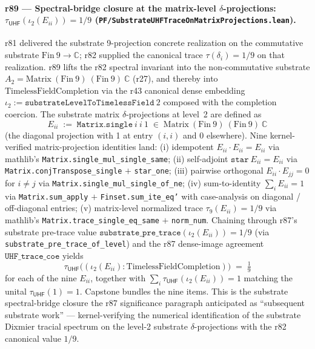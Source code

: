 \documentclass[11pt,a4paper]{amsart}
\theoremstyle{plain}
\theoremstyle{definition}
\begin{document}
\paragraph{r89 --- Spectral-bridge closure at the matrix-level $\delta$-projections: $\tau_{\textsf{UHF}}(\iota_2(E_{ii})) = 1/9$ (\texttt{PF/SubstrateUHFTraceOnMatrixProjections.lean}).} r81 delivered the substrate 9-projection concrete realization on the commutative substrate $\mathrm{Fin}~9 \to \mathbb{C}$; r82 supplied the canonical trace $\tau(\delta_i) = 1/9$ on that realization. r89 lifts the r82 spectral invariant into the non-commutative substrate $A_2 = \mathrm{Matrix}~(\mathrm{Fin}~9)~(\mathrm{Fin}~9)~\mathbb{C}$ (r27), and thereby into $\mathrm{TimelessFieldCompletion}$ via the r43 canonical dense embedding $\iota_2 := \mathtt{substrateLevelToTimelessField}~2$ composed with the completion coercion. The substrate matrix $\delta$-projections at level~2 are defined as
\[
E_{ii} \;:=\; \mathtt{Matrix.single}~i~i~1 \;\in\; \mathrm{Matrix}~(\mathrm{Fin}~9)~(\mathrm{Fin}~9)~\mathbb{C}
\]
(the diagonal projection with 1 at entry $(i,i)$ and 0 elsewhere). Nine kernel-verified matrix-projection identities land: (i) idempotent $E_{ii} \cdot E_{ii} = E_{ii}$ via mathlib's \texttt{Matrix.single\_mul\_single\_same}; (ii) self-adjoint $\mathtt{star}~E_{ii} = E_{ii}$ via \texttt{Matrix.conjTranspose\_single} $+$ \texttt{star\_one}; (iii) pairwise orthogonal $E_{ii} \cdot E_{jj} = 0$ for $i \ne j$ via \texttt{Matrix.single\_mul\_single\_of\_ne}; (iv) sum-to-identity $\sum_i E_{ii} = 1$ via \texttt{Matrix.sum\_apply} $+$ \texttt{Finset.sum\_ite\_eq'} with case-analysis on diagonal / off-diagonal entries; (v) matrix-level normalized trace $\tau_9(E_{ii}) = 1/9$ via mathlib's \texttt{Matrix.trace\_single\_eq\_same} $+$ \texttt{norm\_num}. Chaining through r87's substrate pre-trace value $\mathtt{substrate\_pre\_trace}(\iota_2(E_{ii})) = 1/9$ (via \texttt{substrate\_pre\_trace\_of\_level}) and the r87 dense-image agreement $\mathtt{UHF\_trace\_coe}$ yields
\[
\boxed{\; \tau_{\textsf{UHF}}\bigl((\iota_2(E_{ii}) : \mathrm{TimelessFieldCompletion})\bigr) \;=\; \tfrac{1}{9} \;}
\]
for each of the nine $E_{ii}$, together with $\sum_i \tau_{\textsf{UHF}}(\iota_2(E_{ii})) = 1$ matching the unital $\tau_{\textsf{UHF}}(1) = 1$. Capstone  bundles the nine items. This is the substrate spectral-bridge closure the r87 significance paragraph anticipated as ``subsequent substrate work'' --- kernel-verifying the numerical identification of the substrate Dixmier tracial spectrum on the level-2 substrate $\delta$-projections with the r82 canonical value $1/9$.
\end{document}
